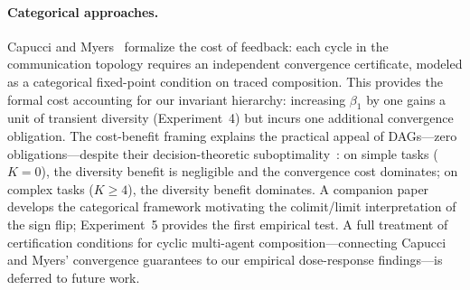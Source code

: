 \paragraph{Categorical approaches.}
Capucci and Myers~\cite{capucci2026feedback} formalize the cost of
feedback: each cycle in the communication topology requires an
independent convergence certificate, modeled as a categorical
fixed-point condition on traced composition.  This provides the formal
cost accounting for our invariant hierarchy: increasing $\beta_1$ by
one gains a unit of transient diversity (Experiment~4) but incurs one
additional convergence obligation.  The cost-benefit framing explains
the practical appeal of DAGs---zero obligations---despite their
decision-theoretic suboptimality~\cite{ao2026reliability}: on simple
tasks ($K = 0$), the diversity benefit is negligible and the
convergence cost dominates; on complex tasks ($K \geq 4$), the
diversity benefit dominates.
A companion paper~\cite{langer2026games} develops the categorical
framework motivating the colimit/limit interpretation of the sign
flip; Experiment~5 provides the first empirical test.
A full treatment of certification conditions for cyclic multi-agent
composition---connecting Capucci and Myers' convergence guarantees to
our empirical dose-response findings---is deferred to future work.



%



